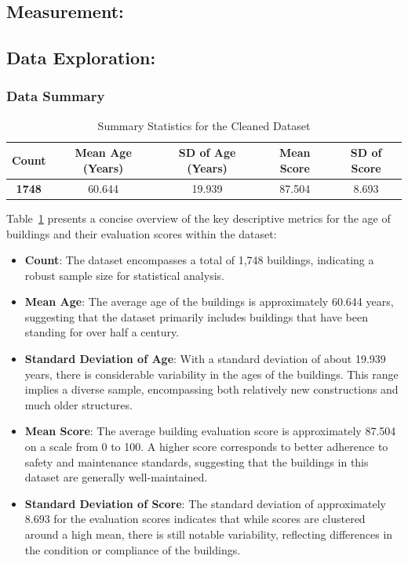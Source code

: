 \documentclass[
  letterpaper,
  DIV=11,
  numbers=noendperiod]{scrartcl}
\begin{document}
\hypertarget{measurement}{%
\subsection{Measurement:}\label{measurement}}

\newpage

\hypertarget{data-exploration}{%
\subsection{Data Exploration:}\label{data-exploration}}

\hypertarget{data-summary}{%
\subsubsection{Data Summary}\label{data-summary}}

\hypertarget{tbl-summary-table}{}
\begin{longtable}[t]{>{}ccccc}
\caption{\label{tbl-summary-table}Summary Statistics for the Cleaned Dataset }\tabularnewline

\toprule
Count & Mean Age (Years) & SD of Age (Years) & Mean Score & SD of Score\\
\midrule
\textbf{1748} & 60.644 & 19.939 & 87.504 & 8.693\\
\bottomrule
\end{longtable}

Table~\ref{tbl-summary-table} presents a concise overview of the key
descriptive metrics for the age of buildings and their evaluation scores
within the dataset:

\begin{itemize}
\item
  \textbf{Count}: The dataset encompasses a total of 1,748 buildings,
  indicating a robust sample size for statistical analysis.
\item
  \textbf{Mean Age}: The average age of the buildings is approximately
  60.644 years, suggesting that the dataset primarily includes buildings
  that have been standing for over half a century.
\item
  \textbf{Standard Deviation of Age}: With a standard deviation of about
  19.939 years, there is considerable variability in the ages of the
  buildings. This range implies a diverse sample, encompassing both
  relatively new constructions and much older structures.
\item
  \textbf{Mean Score}: The average building evaluation score is
  approximately 87.504 on a scale from 0 to 100. A higher score
  corresponds to better adherence to safety and maintenance standards,
  suggesting that the buildings in this dataset are generally
  well-maintained.
\item
  \textbf{Standard Deviation of Score}: The standard deviation of
  approximately 8.693 for the evaluation scores indicates that while
  scores are clustered around a high mean, there is still notable
  variability, reflecting differences in the condition or compliance of
  the buildings.
\end{itemize}
\end{document}
